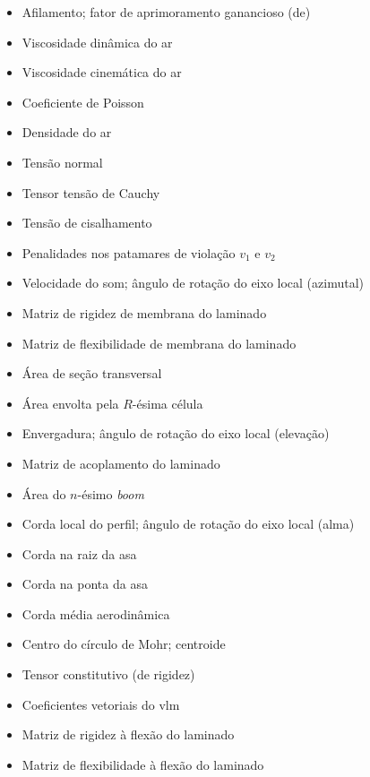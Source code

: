 {\begin{itemize}[
        labelwidth=1.5cm,
        align=left,
        itemindent=0cm,
        leftmargin=2cm,
        itemsep=0em
    ]
    \item[$\lambda$] Afilamento; fator de aprimoramento ganancioso (\acrshort{de})
    \item[$\mu$] Viscosidade dinâmica do ar
    \item[$\nu$] Viscosidade cinemática do ar
    \item[$\nu_{ij}$] Coeficiente de Poisson
    \item[$\rho$] Densidade do ar
    \item[$\sigma$] Tensão normal
    \item[$\sigma_{ij}$] Tensor tensão de Cauchy
    \item[$\tau$] Tensão de cisalhamento
    \item[$\psi_1, \psi_2$] Penalidades nos patamares de violação $v_1$ e $v_2$
    
    \clearpage
    \item[$a$] Velocidade do som;
    ângulo de rotação do eixo local (azimutal)
    \item[$\mathbf{[A]}$] Matriz de rigidez de membrana do laminado
    \item[$\mathbf{[a]}$] Matriz de flexibilidade de membrana do laminado
    \item[$A$] Área de seção transversal
    \item[$A_R$] Área envolta pela $R$-ésima célula
    \item[$b$] Envergadura;
    ângulo de rotação do eixo local (elevação)
    \item[$\mathbf{[B]}$] Matriz de acoplamento do laminado
    \item[$B_n$] Área do $n$-ésimo \textit{boom}
    \item[$c$] Corda local do perfil;
    ângulo de rotação do eixo local (alma)
    \item[$c_r$] Corda na raiz da asa
    \item[$c_t$] Corda na ponta da asa
    \item[$\overline{\overline{c}}$] Corda média aerodinâmica
    \item[$C$] Centro do círculo de Mohr;
    centroide
    \item[$C_{ijkl}$] Tensor constitutivo (de rigidez)
    \item[$\vv{C_{mn}}$] Coeficientes vetoriais do \acrshort{vlm}
    \item[$\mathbf{[D]}$] Matriz de rigidez à flexão do laminado
    \item[$\mathbf{[d]}$] Matriz de flexibilidade à flexão do laminado

\end{itemize}}
